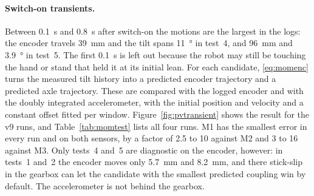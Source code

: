 \paragraph{Switch-on transients.} Between \SI{0.1}{s} and \SI{0.8}{s} after
switch-on the motions are the largest in the logs: the encoder travels
\SI{39}{mm} and the tilt spans \SI{11}{\degree} in test~4, and \SI{96}{mm} and
\SI{3.9}{\degree} in test~5. The first \SI{0.1}{s} is left out because the
robot may still be touching the hand or stand that held it at its initial lean.
For each candidate, \eqref{eq:momenc} turns the measured tilt history into a
predicted encoder trajectory and a predicted axle trajectory. These are
compared with the logged encoder and with the doubly integrated accelerometer,
with the initial position and velocity and a constant offset fitted per window.
Figure~\ref{fig:pvtransient} shows the result for the v9 runs, and
Table~\ref{tab:momtest} lists all four runs. M1 has the smallest error in every
run and on both sensors, by a factor of 2.5 to 10 against M2 and 3 to 16
against M3. Only tests~4 and~5 are diagnostic on the encoder, however: in
tests~1 and~2 the encoder moves only \SI{5.7}{mm} and \SI{8.2}{mm}, and there
stick-slip in the gearbox can let the candidate with the smallest predicted
coupling win by default. The accelerometer is not behind the gearbox.

